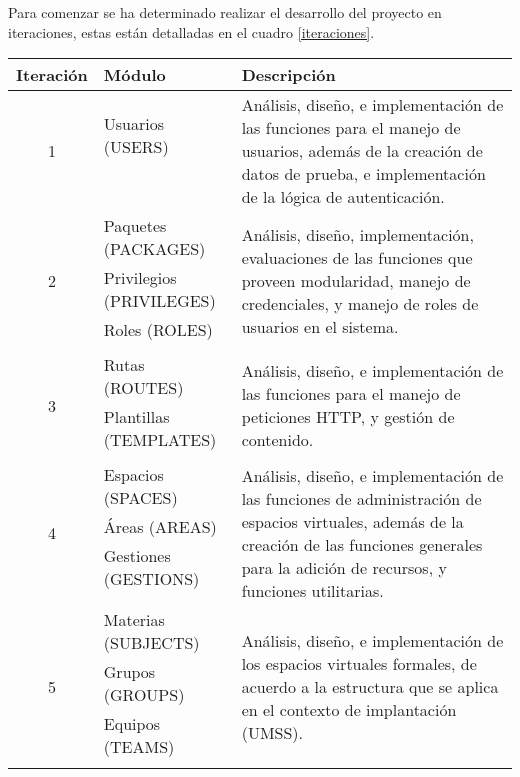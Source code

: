 Para comenzar se ha determinado realizar el desarrollo del proyecto en
iteraciones, estas están detalladas en el cuadro \ref{iteraciones}.

\begin{table}
\centering
\begin{tabular}{|c|l|p{8.0cm}|}
\hline
Iteración & Módulo & Descripción \\
\hline

\multirow{4}{*}{1} &
Usuarios (USERS) &
\multirow{4}{8cm}{Análisis, diseño, e implementación de las funciones para el
manejo de usuarios, además de la creación de datos de prueba, e implementación
de la lógica de autenticación.} \\
 &  & \\
 &  & \\
 &  & \\
\hline

\multirow{4}{*}{2} &
Paquetes (PACKAGES) &
\multirow{4}{8cm}{Análisis, diseño, implementación, evaluaciones de las
funciones que proveen modularidad, manejo de credenciales, y manejo de roles de
usuarios en el sistema.} \\
 & Privilegios (PRIVILEGES) & \\
 & Roles (ROLES) & \\
 &  & \\
\hline

\multirow{3}{*}{3} &
Rutas (ROUTES) &
\multirow{3}{8cm}{Análisis, diseño, e implementación de las funciones para el
manejo de peticiones HTTP, y gestión de contenido.} \\
 & Plantillas (TEMPLATES) & \\
 & & \\
\hline

\multirow{5}{*}{4} &
Espacios (SPACES) &
\multirow{5}{8cm}{Análisis, diseño, e implementación de las funciones de
administración de espacios virtuales, además de la creación de las funciones
generales para la adición de recursos, y funciones utilitarias.} \\
 & Áreas (AREAS) & \\
 & Gestiones (GESTIONS) & \\
 & & \\
 & & \\
\hline

\multirow{4}{*}{5} &
Materias (SUBJECTS) &
\multirow{4}{8cm}{Análisis, diseño, e implementación de los espacios virtuales
formales, de acuerdo a la estructura que se aplica en el contexto de
implantación (UMSS).} \\
 & Grupos (GROUPS) & \\
 & Equipos (TEAMS) & \\
 & & \\
\hline


\end{tabular}
\end{table}
